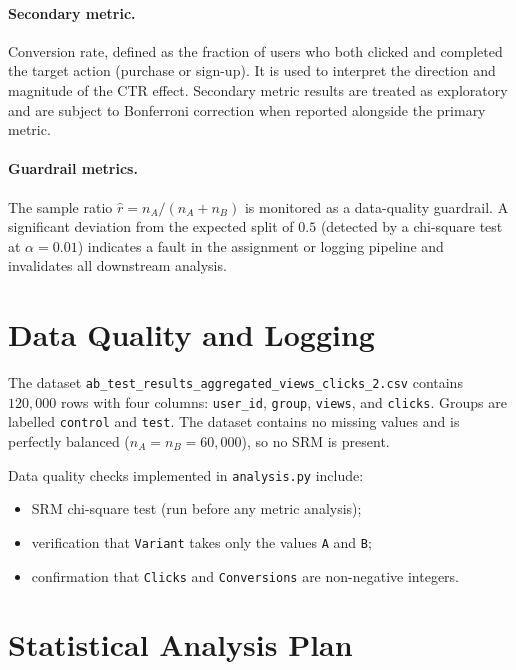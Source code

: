 \documentclass[a4paper,12pt]{extarticle}
\numberwithin{equation}{section}
\begin{document}
\paragraph{Secondary metric.} Conversion rate, defined as the
fraction of users who both clicked and completed the target
action (purchase or sign-up). It is used to interpret the
direction and magnitude of the CTR effect. Secondary metric
results are treated as exploratory and are subject to
Bonferroni correction when reported alongside the primary
metric.

\paragraph{Guardrail metrics.} The sample ratio
$\hat{r} = n_A / (n_A + n_B)$ is monitored as a data-quality
guardrail. A significant deviation from the expected split of
$0.5$ (detected by a chi-square test at $\alpha = 0.01$)
indicates a fault in the assignment or logging pipeline and
invalidates all downstream analysis.

\section{Data Quality and Logging}

The dataset \texttt{ab\_test\_results\_aggregated\_views\_clicks\_2.csv}
contains $120{,}000$ rows with four columns: \texttt{user\_id},
\texttt{group}, \texttt{views}, and \texttt{clicks}. Groups are
labelled \texttt{control} and \texttt{test}. The dataset
contains no missing values and is perfectly balanced
($n_A = n_B = 60{,}000$), so no SRM is present.

Data quality checks implemented in \texttt{analysis.py} include:
\begin{itemize}
    \item SRM chi-square test (run before any metric analysis);
    \item verification that \texttt{Variant} takes only the
          values \texttt{A} and \texttt{B};
    \item confirmation that \texttt{Clicks} and
          \texttt{Conversions} are non-negative integers.
\end{itemize}

\section{Statistical Analysis Plan}
\label{sec:stat}
\end{document}
